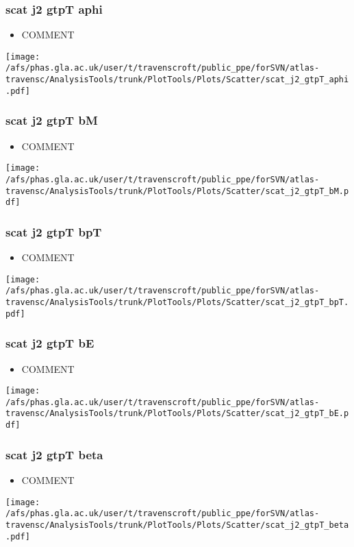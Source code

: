 \documentclass{beamer}
\begin{document}
\begin{frame}
\frametitle{scat j2 gtpT aphi}
\begin{itemize}
\item COMMENT
\end{itemize}
\begin{center}
\texttt{[image: /afs/phas.gla.ac.uk/user/t/travenscroft/public\_ppe/forSVN/atlas-travensc/AnalysisTools/trunk/PlotTools/Plots/Scatter/scat\_j2\_gtpT\_aphi.pdf]}
\end{center}
\end{frame}

\begin{frame}
\frametitle{scat j2 gtpT bM}
\begin{itemize}
\item COMMENT
\end{itemize}
\begin{center}
\texttt{[image: /afs/phas.gla.ac.uk/user/t/travenscroft/public\_ppe/forSVN/atlas-travensc/AnalysisTools/trunk/PlotTools/Plots/Scatter/scat\_j2\_gtpT\_bM.pdf]}
\end{center}
\end{frame}

\begin{frame}
\frametitle{scat j2 gtpT bpT}
\begin{itemize}
\item COMMENT
\end{itemize}
\begin{center}
\texttt{[image: /afs/phas.gla.ac.uk/user/t/travenscroft/public\_ppe/forSVN/atlas-travensc/AnalysisTools/trunk/PlotTools/Plots/Scatter/scat\_j2\_gtpT\_bpT.pdf]}
\end{center}
\end{frame}

\begin{frame}
\frametitle{scat j2 gtpT bE}
\begin{itemize}
\item COMMENT
\end{itemize}
\begin{center}
\texttt{[image: /afs/phas.gla.ac.uk/user/t/travenscroft/public\_ppe/forSVN/atlas-travensc/AnalysisTools/trunk/PlotTools/Plots/Scatter/scat\_j2\_gtpT\_bE.pdf]}
\end{center}
\end{frame}

\begin{frame}
\frametitle{scat j2 gtpT beta}
\begin{itemize}
\item COMMENT
\end{itemize}
\begin{center}
\texttt{[image: /afs/phas.gla.ac.uk/user/t/travenscroft/public\_ppe/forSVN/atlas-travensc/AnalysisTools/trunk/PlotTools/Plots/Scatter/scat\_j2\_gtpT\_beta.pdf]}
\end{center}
\end{frame}
\end{document}

